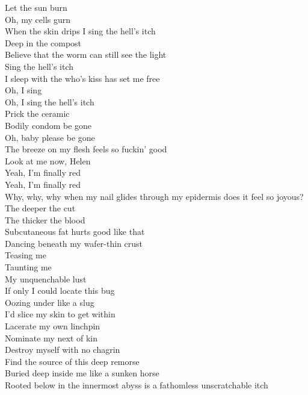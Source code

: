 Let the sun burn \\
Oh, my cells gurn \\
When the skin drips I sing the hell's itch \\
Deep in the compost \\
Believe that the worm can still see the light \\
Sing the hell's itch \\
I sleep with the  who's kiss has set me free \\
Oh, I sing \\
Oh, I sing the hell's itch \\
Prick the ceramic \\
Bodily condom be gone \\
Oh, baby please be gone \\
The breeze on my flesh feels so fuckin' good \\
Look at me now, Helen \\
Yeah, I'm finally red \\
Yeah, I'm finally red \\

Why, why, why when my nail glides through my epidermis does it feel so joyous? \\
The deeper the cut \\
The thicker the blood \\
Subcutaneous fat hurts good like that \\
Dancing beneath my wafer-thin crust \\
Teasing me \\
Taunting me \\
My unquenchable lust \\
If only I could locate this bug \\
Oozing under like a slug \\
I'd slice my skin to get within \\
Lacerate my own linchpin \\
Nominate my next of kin \\
Destroy myself with no chagrin \\
Find the source of this deep remorse \\
Buried deep inside me like a sunken horse \\
Rooted below in the innermost abyss is a fathomless unscratchable itch \\


